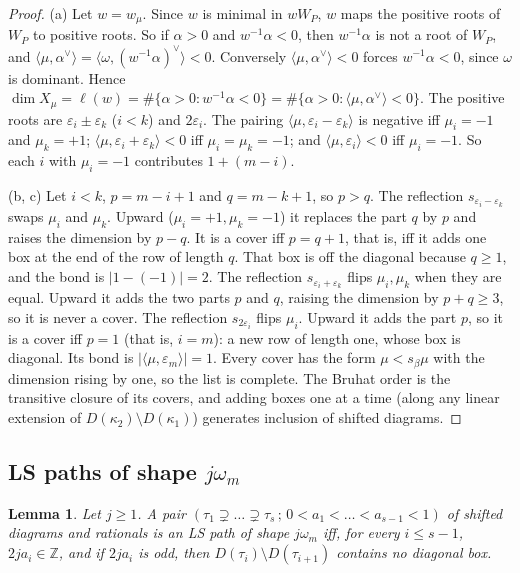 \documentclass[11pt]{amsart}
\newtheorem{lemma}[theorem]{Lemma}
\theoremstyle{definition}
\theoremstyle{remark}
\newcommand{\Z}{\mathbb{Z}}
\begin{document}
\begin{proof}
(a) Let $w=w_\mu$. Since $w$ is minimal in $wW_P$, $w$ maps the positive roots of $W_P$ to
positive roots. So if $\alpha>0$ and $w^{-1}\alpha<0$, then $w^{-1}\alpha$ is not a root of
$W_P$, and $\langle\mu,\alpha^\vee\rangle=\langle\omega,(w^{-1}\alpha)^\vee\rangle<0$. Conversely
$\langle\mu,\alpha^\vee\rangle<0$ forces $w^{-1}\alpha<0$, since $\omega$ is dominant. Hence
$\dim X_\mu=\ell(w)=\#\{\alpha>0:w^{-1}\alpha<0\}=\#\{\alpha>0:\langle\mu,\alpha^\vee\rangle<0\}$.
The positive roots are $\varepsilon_i\pm\varepsilon_k$ ($i<k$) and $2\varepsilon_i$.
The pairing $\langle\mu,\varepsilon_i-\varepsilon_k\rangle$ is negative iff $\mu_i=-1$ and
$\mu_k=+1$; $\langle\mu,\varepsilon_i+\varepsilon_k\rangle<0$ iff $\mu_i=\mu_k=-1$; and
$\langle\mu,\varepsilon_i\rangle<0$ iff $\mu_i=-1$. So each $i$ with $\mu_i=-1$ contributes
$1+(m-i)$.

(b, c) Let $i<k$, $p=m-i+1$ and $q=m-k+1$, so $p>q$. The reflection
$s_{\varepsilon_i-\varepsilon_k}$ swaps $\mu_i$ and $\mu_k$. Upward
($\mu_i=+1,\mu_k=-1$) it replaces the part $q$ by $p$ and raises the dimension by $p-q$. It is
a cover iff $p=q+1$, that is, iff it adds one box at the end of the row of length $q$. That
box is off the diagonal because $q\ge1$, and the bond is $|1-(-1)|=2$. The reflection
$s_{\varepsilon_i+\varepsilon_k}$ flips $\mu_i,\mu_k$ when they are equal. Upward it adds the
two parts $p$ and $q$, raising the dimension by $p+q\ge3$, so it is never a cover. The
reflection $s_{2\varepsilon_i}$ flips $\mu_i$. Upward it adds the part $p$, so it is a cover
iff $p=1$ (that is, $i=m$): a new row of length one, whose box is diagonal. Its bond is
$|\langle\mu,\varepsilon_m\rangle|=1$. Every cover has the form $\mu<s_\beta\mu$ with the
dimension rising by one, so the list is complete. The Bruhat order is the transitive closure of
its covers, and adding boxes one at a time (along any linear extension of
$D(\kappa_2)\setminus D(\kappa_1)$) generates inclusion of shifted diagrams.
\end{proof}

\subsection{LS paths of shape \texorpdfstring{$j\omega_m$}{j omega}}

\begin{lemma}\label{lem:lsparity}
Let $j\ge1$. A pair $(\tau_1\supsetneq\dots\supsetneq\tau_s\,;\,0<a_1<\dots<a_{s-1}<1)$ of
shifted diagrams and rationals is an LS path of shape $j\omega_m$ iff, for every
$i\le s-1$, $2ja_i\in\Z$, and if $2ja_i$ is odd, then $D(\tau_i)\setminus D(\tau_{i+1})$
contains no diagonal box.
\end{lemma}
\end{document}
